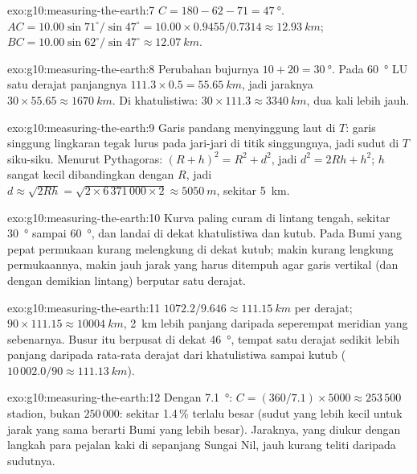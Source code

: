 \begin{solution}{exo:g10:measuring-the-earth:7}
$C = 180 - 62 - 71 = \qty{47}{\degree}$.
$AC = 10.00 \sin 71^\circ/\sin 47^\circ = 10.00 \times 0.9455/0.7314 \approx
\qty{12.93}{km}$; $BC = 10.00 \sin 62^\circ/\sin 47^\circ \approx
\qty{12.07}{km}$.
\end{solution}

\begin{solution}{exo:g10:measuring-the-earth:8}
Perubahan bujurnya $10 + 20 = \qty{30}{\degree}$. Pada
\qty{60}{\degree} LU satu derajat panjangnya $111.3 \times 0.5 = \qty{55.65}{km}$, jadi
jaraknya $30 \times 55.65 \approx \qty{1670}{km}$. Di khatulistiwa:
$30 \times 111.3 \approx \qty{3340}{km}$, dua kali lebih jauh.
\end{solution}

\begin{solution}{exo:g10:measuring-the-earth:9}
Garis pandang menyinggung laut di $T$: garis singgung lingkaran tegak lurus
pada jari-jari di titik singgungnya, jadi sudut di $T$ siku-siku. Menurut
Pythagoras: $(R+h)^2 = R^2 + d^2$, jadi $d^2 = 2Rh + h^2$; $h$ sangat kecil
dibandingkan dengan $R$, jadi $d \approx \sqrt{2Rh} = \sqrt{2 \times
6\,371\,000 \times 2} \approx \qty{5050}{m}$, sekitar \qty{5}{km}.
\end{solution}

\begin{solution}{exo:g10:measuring-the-earth:10}
Kurva paling curam di lintang tengah, sekitar \qty{30}{\degree} sampai
\qty{60}{\degree}, dan landai di dekat khatulistiwa dan kutub. Pada Bumi yang
pepat permukaan kurang melengkung di dekat kutub; makin kurang lengkung
permukaannya, makin jauh jarak yang harus ditempuh agar garis vertikal (dan
dengan demikian lintang) berputar satu derajat.
\end{solution}

\begin{solution}{exo:g10:measuring-the-earth:11}
$1072.2/9.646 \approx \qty{111.15}{km}$ per derajat; $90 \times 111.15
\approx \qty{10004}{km}$, \qty{2}{km} lebih panjang daripada seperempat
meridian yang sebenarnya. Busur itu berpusat di dekat \qty{46}{\degree}, tempat
satu derajat sedikit lebih panjang daripada rata-rata derajat dari
khatulistiwa sampai kutub ($10\,002.0/90 \approx \qty{111.13}{km}$).
\end{solution}

\begin{solution}{exo:g10:measuring-the-earth:12}
Dengan \qty{7.1}{\degree}: $C = (360/7.1) \times 5000 \approx 253\,500$ stadion,
bukan $250\,000$: sekitar 1.4\,\% terlalu besar (sudut yang lebih kecil untuk
jarak yang sama berarti Bumi yang lebih besar). Jaraknya, yang diukur dengan
langkah para pejalan kaki di sepanjang Sungai Nil, jauh kurang teliti daripada
sudutnya.
\end{solution}


